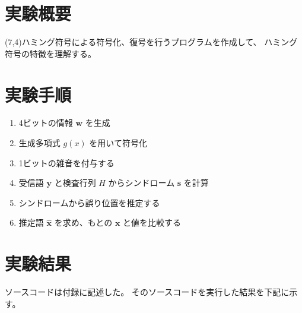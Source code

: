 \documentclass[12pt]{jarticle}
\begin{document}



\section{実験概要}
 (7,4)ハミング符号による符号化、復号を行うプログラムを作成して、
ハミング符号の特徴を理解する。

\section{実験手順}
\begin{enumerate}
    \item 4ビットの情報 $\boldsymbol{w}$ を生成
    \item 生成多項式 $g(x)$ を用いて符号化
    \item 1ビットの雑音を付与する
    \item 受信語 $\boldsymbol{y}$ と検査行列 $H$ からシンドローム $\boldsymbol{s}$ を計算
    \item シンドロームから誤り位置を推定する
    \item 推定語 $\hat{\boldsymbol{x}}$ を求め、もとの $\boldsymbol{x}$ と値を比較する
\end{enumerate}

\section{実験結果}

ソースコードは付録に記述した。
そのソースコードを実行した結果を下記に示す。
\end{document}
